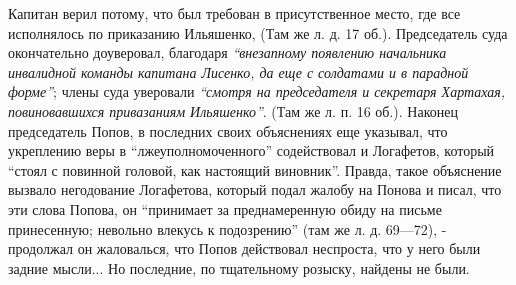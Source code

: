 \documentclass[a4paper,20pt]{article}
\begin{document}
Капитан верил потому, что был требован в присутственное место, где все исполнялось 
по приказанию Ильяшенко, (Там же л. д. 17 об.). Председатель суда окончательно доуверовал, 
благодаря
\emph{``внезапному появлению начальника инвалидной команды капитана Лисенко, 
да еще с солдатами и в парадной форме''};
члены суда уверовали \emph{``смотря на председателя и секретаря
Хартахая, повиновавшихся привазаниям Ильяшенко''}. (Там
же л. п. 16 об.). Наконец председатель Попов, в последних своих объяснениях еще
указывал, 
что укреплению веры в ``лжеуполномоченного'' содействовал и Логафетов, который ``стоял с повинной головой, как настоящий
виновник''.
Правда, такое объяснение вызвало негодование
Логафетова, который подал жалобу на Понова и писал,
что эти слова Попова, он ``принимает за преднамеренную
обиду на письме принесенную; невольно влекусь к подозрению'' (там же л. д. 69—72), - продолжал он 
жаловалься, что Попов действовал неспроста, что у него
были задние мысли... Но последние, по тщательному розыску,
найдены не были.
\end{document}

